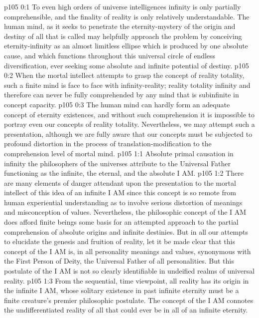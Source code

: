 \author{Melchizedek}
\vs p105 0:1 To even high orders of universe intelligences infinity is only partially comprehensible, and the finality of reality is only relatively understandable. The human mind, as it seeks to penetrate the eternity\hyp{}mystery of the origin and destiny of all that is called  may helpfully approach the problem by conceiving eternity\hyp{}infinity as an almost limitless ellipse which is produced by one absolute cause, and which functions throughout this universal circle of endless diversification, ever seeking some absolute and infinite potential of destiny.\plusone
\vs p105 0:2 When the mortal intellect attempts to grasp the concept of reality totality, such a finite mind is face to face with infinity\hyp{}reality; reality totality  infinity and therefore can never be fully comprehended by any mind that is subinfinite in concept capacity.
\vs p105 0:3 The human mind can hardly form an adequate concept of eternity existences, and without such comprehension it is impossible to portray even our concepts of reality totality. Nevertheless, we may attempt such a presentation, although we are fully aware that our concepts must be subjected to profound distortion in the process of translation\hyp{}modification to the comprehension level of mortal mind.
\vs p105 1:1 Absolute primal causation in infinity the philosophers of the universes attribute to the Universal Father functioning as the infinite, the eternal, and the absolute I AM.
\vs p105 1:2 There are many elements of danger attendant upon the presentation to the mortal intellect of this idea of an infinite I AM since this concept is so remote from human experiential understanding as to involve serious distortion of meanings and misconception of values. Nevertheless, the philosophic concept of the I AM does afford finite beings some basis for an attempted approach to the partial comprehension of absolute origins and infinite destinies. But in all our attempts to elucidate the genesis and fruition of reality, let it be made clear that this concept of the I AM is, in all personality meanings and values, synonymous with the First Person of Deity, the Universal Father of all personalities. But this postulate of the I AM is not so clearly identifiable in undeified realms of universal reality.
\pc \vs p105 1:3  From the sequential, time viewpoint, all reality has its origin in the infinite I AM, whose solitary existence in past infinite eternity must be a finite creature’s premier philosophic postulate. The concept of the I AM connotes  the undifferentiated reality of all that could ever be in all of an infinite eternity.

